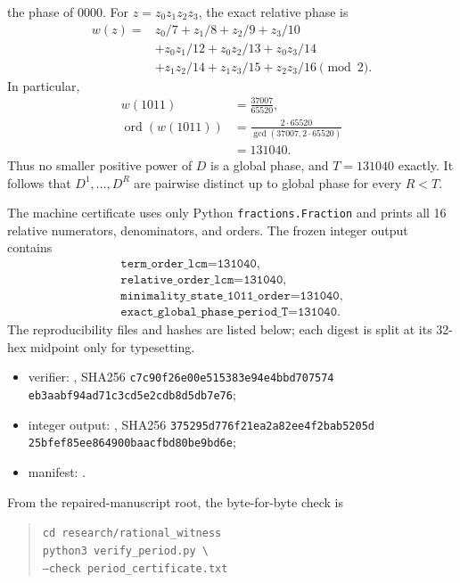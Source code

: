 the phase of $0000$.  For $z=z_0z_1z_2z_3$, the exact relative phase is
\begin{equation*}
\begin{aligned}
w(z)={}&z_0/7+z_1/8+z_2/9+z_3/10\\
 &+z_0z_1/12+z_0z_2/13+z_0z_3/14\\
 &+z_1z_2/14+z_1z_3/15+z_2z_3/16
 \pmod 2.
\end{aligned}
\end{equation*}
In particular,
\begin{equation*}
\begin{aligned}
 w(1011)&=\frac{37007}{65520},\\
 \operatorname{ord}(w(1011))
 &=\frac{2\cdot65520}{\gcd(37007,2\cdot65520)}\\
 &=131040.
\end{aligned}
\end{equation*}
Thus no smaller positive power of $D$ is a global phase, and
$T=131040$ exactly.  It follows that
$D^1,\ldots,D^R$ are pairwise distinct up to global phase for every
$R<T$.

The machine certificate uses only Python \texttt{fractions.Fraction} and
prints all 16 relative numerators, denominators, and orders.  The frozen
integer output contains
\begin{equation*}
\begin{gathered}
\texttt{term\_order\_lcm=131040},\\
\texttt{relative\_order\_lcm=131040},\\
\texttt{minimality\_state\_1011\_order=131040},\\
\texttt{exact\_global\_phase\_period\_T=131040}.
\end{gathered}
\end{equation*}
The reproducibility files and hashes are listed below; each digest is split
at its 32-hex midpoint only for typesetting.
\begin{itemize}[leftmargin=1.5em]
 \item verifier: ,
 SHA256 \texttt{c7c90f26e00e515383e94e4bbd707574}\allowbreak
 \texttt{eb3aabf94ad71c3cd5e2cdb8d5db7e76};
 \item integer output:
 , SHA256
 \texttt{375295d776f21ea2a82ee4f2bab5205d}\allowbreak
 \texttt{25bfef85ee864900baacfbd80be9bd6e};
 \item manifest: .
\end{itemize}
From the repaired-manuscript root, the byte-for-byte check is
\begin{quote}
\footnotesize
\texttt{cd research/rational\_witness}\\
\texttt{python3 verify\_period.py \textbackslash}\\
\texttt{\quad --check period\_certificate.txt}
\end{quote}

